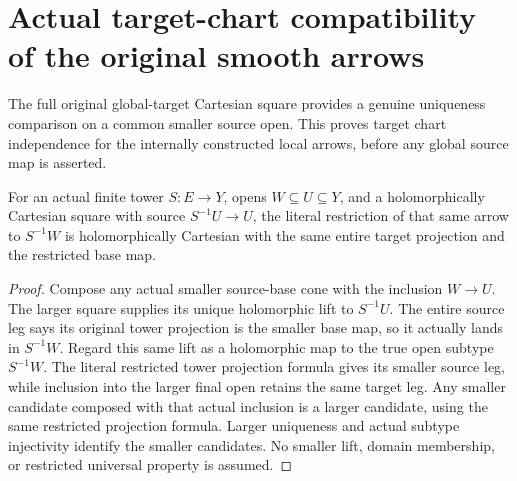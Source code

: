 \section{Actual target-chart compatibility of the original smooth arrows}

The full original global-target Cartesian square provides a genuine
uniqueness comparison on a common smaller source open. This proves target
chart independence for the internally constructed local arrows, before
any global source map is asserted.

\begin{lemma}
\label{hir:actual-holomorphic-cartesian-tower-source-open-restriction}
\leanok
{}
For an actual finite tower $S:E\to Y$, opens $W\subseteq U\subseteq Y$,
and a holomorphically Cartesian square with source $S^{-1}U\to U$, the
literal restriction of that same arrow to $S^{-1}W$ is holomorphically
Cartesian with the same entire target projection and the restricted base map.
\end{lemma}
\begin{proof}
Compose any actual smaller source-base cone with the inclusion $W\to U$.
The larger square supplies its unique holomorphic lift to $S^{-1}U$.
The entire source leg says its original tower projection is the smaller
base map, so it actually lands in $S^{-1}W$. Regard this same lift as a
holomorphic map to the true open subtype $S^{-1}W$. The literal restricted
tower projection formula gives its smaller source leg, while inclusion
into the larger final open retains the same target leg. Any smaller
candidate composed with that actual inclusion is a larger candidate,
using the same restricted projection formula. Larger uniqueness and
actual subtype injectivity identify the smaller candidates. No smaller
lift, domain membership, or restricted universal property is assumed.
\end{proof}

